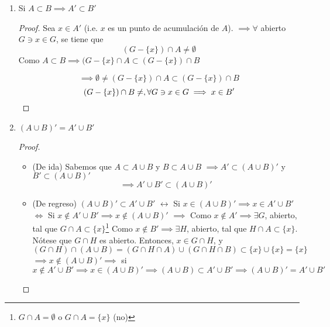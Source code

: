 \begin{proposition}
\begin{enumerate}
    \item Si $A\subset B\implies A'\subset B'$
    \begin{proof}
    Sea $x\in A'$ (i.e. $x$ es un punto de acumulación de $A$). $\implies \forall $ abierto $G\ni x\in G$, se tiene que $$(G-\{x\})\cap A\neq \emptyset $$
    Como $A\subset B\implies (G-\{x\}\cap A\subset (G-\{x\})\cap B$
    
    $$\implies \emptyset\neq (G-\{x\})\cap A\subset (G-\{x\})\cap B$$
    $$(G-\{x\})\cap B\neq \empty,\forall G\ni x\in G\implies x\in B'$$
    \end{proof}
    
    \item $(A\cup B)'=A'\cup B'$
    \begin{proof}
    \begin{itemize}
        \item (De ida) Sabemos que $A\subset A\cup B$ y $B\subset A\cup B$ $\implies A'\subset (A\cup B)'$ y $B'\subset (A\cup B)'$
        $$\implies A'\cup B'\subset (A\cup B)'$$
        \item (De regreso) $(A\cup B)'\subset A'\cup B'$\newline 
        $\longleftrightarrow$ Si $x\in (A\cup B)'\implies x\in A'\cup B'$\newline 
        $\Longleftrightarrow$ Si $x\not\in A'\cup B'\implies x\not\in (A\cup B)'$\newline 
        $\implies$ Como $x\not\in A'\implies\exists G$, abierto, tal que $G\cap A\subset \{x\}$\footnote{$G\cap A=\emptyset$ o $G\cap A=\{x\}$ (no)}\newline 
        Como $x\not\in B'\implies \exists H$, abierto, tal que $H\cap A\subset \{x\}$. Nótese que $G\cap H$ es abierto. Entonces, $x\in G\cap H$, y $(G\cap H)\cap (A\cup B)=(G\cap H\cap A)\cup (G\cap H\cap B)\subset \{x\}\cup \{x\}=\{x\}$\newline 
        $\implies x\not\in (A\cup B)'\implies$ si $x\not\in A'\cup B'\implies x\in (A\cup B)'\implies (A\cup B)\subset A'\cup B'\implies (A\cup B)'=A'\cup B'$
        
        
    \end{itemize}
    \end{proof}
\end{enumerate}
\end{proposition}


